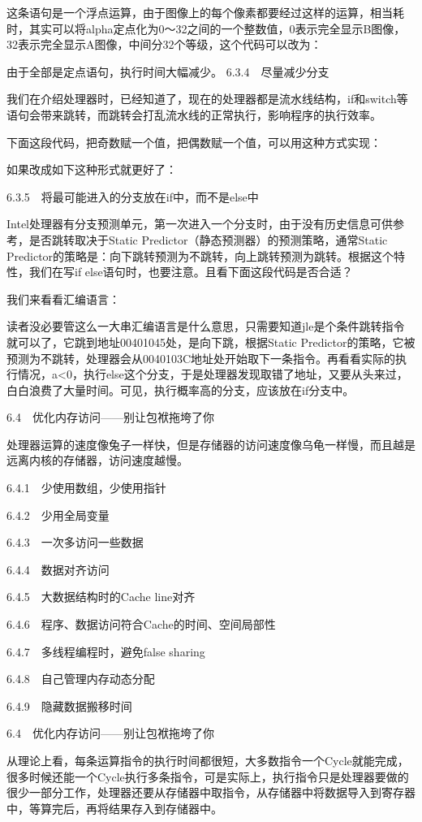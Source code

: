 \documentclass[12pt,UTF8]{ctexbook}
\begin{document}
这条语句是一个浮点运算，由于图像上的每个像素都要经过这样的运算，相当耗时，其实可以将alpha定点化为0～32之间的一个整数值，0表示完全显示B图像，32表示完全显示A图像，中间分32个等级，这个代码可以改为：

由于全部是定点语句，执行时间大幅减少。
6.3.4　尽量减少分支

我们在介绍处理器时，已经知道了，现在的处理器都是流水线结构，if和switch等语句会带来跳转，而跳转会打乱流水线的正常执行，影响程序的执行效率。

下面这段代码，把奇数赋一个值，把偶数赋一个值，可以用这种方式实现：

如果改成如下这种形式就更好了：

6.3.5　将最可能进入的分支放在if中，而不是else中

Intel处理器有分支预测单元，第一次进入一个分支时，由于没有历史信息可供参考，是否跳转取决于Static Predictor（静态预测器）的预测策略，通常Static Predictor的策略是：向下跳转预测为不跳转，向上跳转预测为跳转。根据这个特性，我们在写if else语句时，也要注意。且看下面这段代码是否合适？

我们来看看汇编语言：

读者没必要管这么一大串汇编语言是什么意思，只需要知道jle是个条件跳转指令就可以了，它跳到地址00401045处，是向下跳，根据Static Predictor的策略，它被预测为不跳转，处理器会从0040103C地址处开始取下一条指令。再看看实际的执行情况，a<0，执行else这个分支，于是处理器发现取错了地址，又要从头来过，白白浪费了大量时间。可见，执行概率高的分支，应该放在if分支中。


6.4　优化内存访问——别让包袱拖垮了你

处理器运算的速度像兔子一样快，但是存储器的访问速度像乌龟一样慢，而且越是远离内核的存储器，访问速度越慢。

6.4.1　少使用数组，少使用指针

6.4.2　少用全局变量

6.4.3　一次多访问一些数据

6.4.4　数据对齐访问

6.4.5　大数据结构时的Cache line对齐

6.4.6　程序、数据访问符合Cache的时间、空间局部性

6.4.7　多线程编程时，避免false sharing

6.4.8　自己管理内存动态分配

6.4.9　隐藏数据搬移时间


6.4　优化内存访问——别让包袱拖垮了你

从理论上看，每条运算指令的执行时间都很短，大多数指令一个Cycle就能完成，很多时候还能一个Cycle执行多条指令，可是实际上，执行指令只是处理器要做的很少一部分工作，处理器还要从存储器中取指令，从存储器中将数据导入到寄存器中，等算完后，再将结果存入到存储器中。
\end{document}

